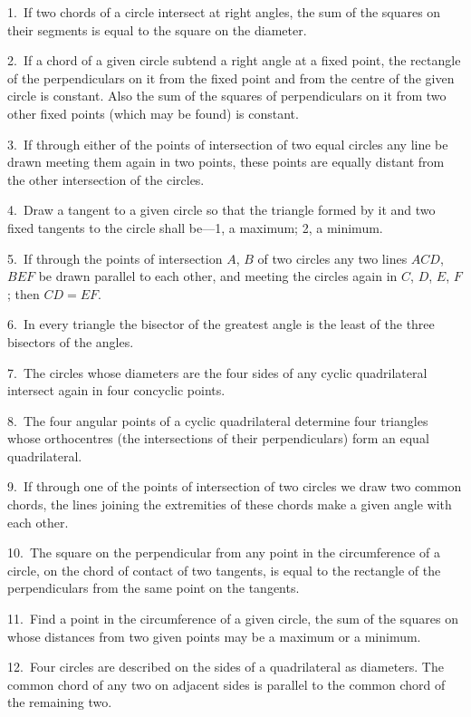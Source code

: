 \documentclass[oneside]{book}
\begin{document}
\begin{footnotesize}
1.~If two chords of a circle intersect at right angles, the sum
of the squares on their segments is equal to the square on the
diameter.

2.~If a chord of a given circle subtend a right angle at a fixed
point, the rectangle of the perpendiculars on it from the fixed
point and from the centre of the given circle is constant. Also
the sum of the squares of perpendiculars on it from two other
fixed points (which may be found) is constant.

3.~If through either of the points of intersection of two equal
circles any line be drawn meeting them again in two points,
these points are equally distant from the other intersection of the
circles.

4.~Draw a tangent to a given circle so that the triangle formed
by it and two fixed tangents to the circle shall be---1, a maximum;
2, a minimum.

5.~If through the points of intersection $A$, $B$ of two circles any
two lines $ACD$, $BEF$ be drawn parallel to each other, and meeting
the circles again in $C$, $D$, $E$, $F$; then $CD = EF$.

6.~In every triangle the bisector of the greatest angle is the
least of the three bisectors of the angles.

7.~The circles whose diameters are the four sides of any cyclic
quadrilateral intersect again in four concyclic points.

8.~The four angular points of a cyclic quadrilateral determine
four triangles whose orthocentres (the intersections of their perpendiculars)
form an equal quadrilateral.

9.~If through one of the points of intersection of two circles
we draw two common chords, the lines joining the extremities
of these chords make a given angle with each other.

10.~The square on the perpendicular from any point in the circumference
of a circle, on the chord of contact of two tangents, is
equal to the rectangle of the perpendiculars from the same point
on the tangents.

11.~Find a point in the circumference of a given circle, the
sum of the squares on whose distances from two given points may
be a maximum or a minimum.

12.~Four circles are described on the sides of a quadrilateral as
diameters. The common chord of any two on adjacent sides is
parallel to the common chord of the remaining two.



\end{footnotesize}
\end{document}
